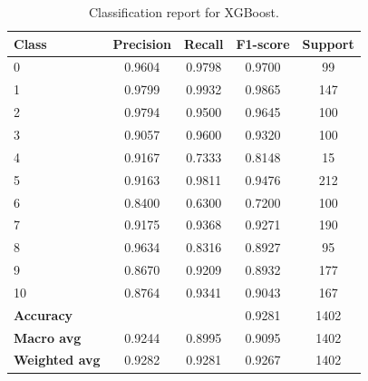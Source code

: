 \begin{table}[h]
    \centering
    \begin{tabular}{lcccc}
        \toprule
        \textbf{Class} & \textbf{Precision} & \textbf{Recall} & \textbf{F1-score} & \textbf{Support} \\
        \midrule
        0 & 0.9604 & 0.9798 & 0.9700 & 99 \\
        1 & 0.9799 & 0.9932 & 0.9865 & 147 \\
        2 & 0.9794 & 0.9500 & 0.9645 & 100 \\
        3 & 0.9057 & 0.9600 & 0.9320 & 100 \\
        4 & 0.9167 & 0.7333 & 0.8148 & 15 \\
        5 & 0.9163 & 0.9811 & 0.9476 & 212 \\
        6 & 0.8400 & 0.6300 & 0.7200 & 100 \\
        7 & 0.9175 & 0.9368 & 0.9271 & 190 \\
        8 & 0.9634 & 0.8316 & 0.8927 & 95 \\
        9 & 0.8670 & 0.9209 & 0.8932 & 177 \\
        10 & 0.8764 & 0.9341 & 0.9043 & 167 \\
        \midrule
       \textbf{Accuracy} & & & 0.9281 & 1402 \\
        \textbf{Macro avg} & 0.9244 & 0.8995 & 0.9095 & 1402 \\
        \textbf{Weighted avg} & 0.9282 & 0.9281 & 0.9267 & 1402 \\
        \bottomrule
    \end{tabular}
    \caption{Classification report for XGBoost.}
    \label{tab:classification_report_xgboost}
\end{table}


